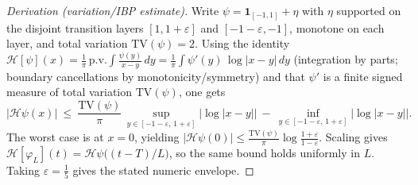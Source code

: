 \documentclass[11pt]{article}
\theoremstyle{definition}
\theoremstyle{remark}
\begin{document}
\begin{proof}[Derivation (variation/IBP estimate)]
Write \(\psi=\mathbf 1_{[-1,1]}+\eta\) with \(\eta\) supported on the disjoint transition layers \([1,1+\varepsilon]\) and \([-1-\varepsilon,-1]\), monotone on each layer, and total variation \(\mathrm{TV}(\psi)=2\). Using the identity \(\mathcal H[\psi](x)=\tfrac{1}{\pi}\,\mathrm{p.v.}\int \tfrac{\psi(y)}{x-y}\,dy=\tfrac{1}{\pi}\int \psi'(y)\,\log|x-y|\,dy\) (integration by parts; boundary cancellations by monotonicity/symmetry) and that \(\psi'\) is a finite signed measure of total variation \(\mathrm{TV}(\psi)\), one gets
\[
  |\mathcal H\psi(x)|\ \le\ \frac{\mathrm{TV}(\psi)}{\pi}\,\sup_{y\in[-1-\varepsilon,\,1+\varepsilon]}\big|\log|x-y|\big|\ -\ \inf_{y\in[-1-\varepsilon,\,1+\varepsilon]}\big|\log|x-y|\big|.
\]
The worst case is at \(x=0\), yielding \(|\mathcal H\psi(0)|\le \tfrac{\mathrm{TV}(\psi)}{\pi}\log\tfrac{1+\varepsilon}{1-\varepsilon}\). Scaling gives \(\mathcal H[\varphi_L](t)=\mathcal H\psi\big((t-T)/L\big)\), so the same bound holds uniformly in \(L\). Taking \(\varepsilon=\tfrac15\) gives the stated numeric envelope.
\end{proof}
\end{document}
